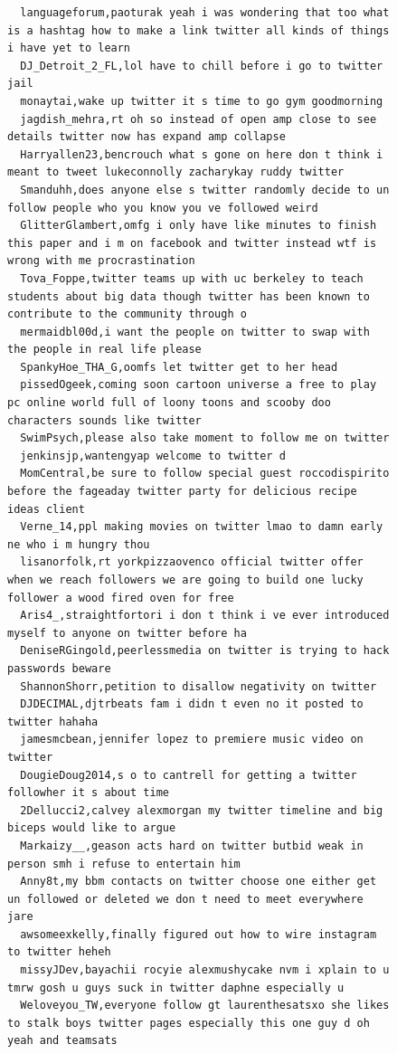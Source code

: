 \begin{figure}[htpb]
\begin{verbatim}
  languageforum,paoturak yeah i was wondering that too what is a hashtag how to make a link twitter all kinds of things i have yet to learn
  DJ_Detroit_2_FL,lol have to chill before i go to twitter jail
  monaytai,wake up twitter it s time to go gym goodmorning
  jagdish_mehra,rt oh so instead of open amp close to see details twitter now has expand amp collapse
  Harryallen23,bencrouch what s gone on here don t think i meant to tweet lukeconnolly zacharykay ruddy twitter
  Smanduhh,does anyone else s twitter randomly decide to un follow people who you know you ve followed weird
  GlitterGlambert,omfg i only have like minutes to finish this paper and i m on facebook and twitter instead wtf is wrong with me procrastination
  Tova_Foppe,twitter teams up with uc berkeley to teach students about big data though twitter has been known to contribute to the community through o
  mermaidbl00d,i want the people on twitter to swap with the people in real life please
  SpankyHoe_THA_G,oomfs let twitter get to her head
  pissedOgeek,coming soon cartoon universe a free to play pc online world full of loony toons and scooby doo characters sounds like twitter
  SwimPsych,please also take moment to follow me on twitter
  jenkinsjp,wantengyap welcome to twitter d
  MomCentral,be sure to follow special guest roccodispirito before the fageaday twitter party for delicious recipe ideas client
  Verne_14,ppl making movies on twitter lmao to damn early ne who i m hungry thou
  lisanorfolk,rt yorkpizzaovenco official twitter offer when we reach followers we are going to build one lucky follower a wood fired oven for free
  Aris4_,straightfortori i don t think i ve ever introduced myself to anyone on twitter before ha
  DeniseRGingold,peerlessmedia on twitter is trying to hack passwords beware
  ShannonShorr,petition to disallow negativity on twitter
  DJDECIMAL,djtrbeats fam i didn t even no it posted to twitter hahaha
  jamesmcbean,jennifer lopez to premiere music video on twitter
  DougieDoug2014,s o to cantrell for getting a twitter followher it s about time
  2Dellucci2,calvey alexmorgan my twitter timeline and big biceps would like to argue
  Markaizy__,geason acts hard on twitter butbid weak in person smh i refuse to entertain him
  Anny8t,my bbm contacts on twitter choose one either get un followed or deleted we don t need to meet everywhere jare
  awsomeexkelly,finally figured out how to wire instagram to twitter heheh
  missyJDev,bayachii rocyie alexmushycake nvm i xplain to u tmrw gosh u guys suck in twitter daphne especially u
  Weloveyou_TW,everyone follow gt laurenthesatsxo she likes to stalk boys twitter pages especially this one guy d oh yeah and teamsats

\end{verbatim}
\end{figure}
